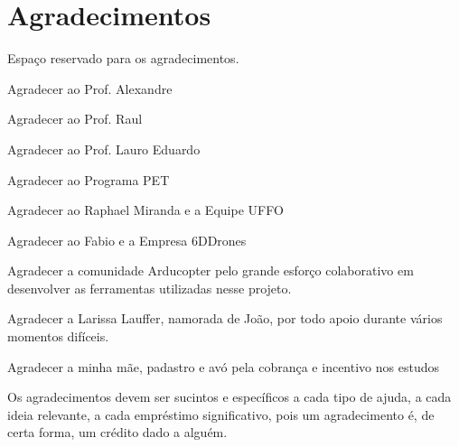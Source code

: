 \documentclass[12pt,a4paper,oneside]{book}
\begin{document}
\chapter*{Agradecimentos}

\thispagestyle{myheadings}

Espaço reservado para os agradecimentos.

Agradecer ao Prof. Alexandre

Agradecer ao Prof. Raul

Agradecer ao Prof. Lauro Eduardo

Agradecer ao Programa PET

Agradecer ao Raphael Miranda e a Equipe UFFO

Agradecer ao Fabio e a Empresa 6DDrones

Agradecer a comunidade Arducopter pelo grande esforço colaborativo em desenvolver as ferramentas utilizadas nesse projeto.

Agradecer a Larissa Lauffer, namorada de João, por todo apoio durante vários momentos difíceis.

Agradecer a minha mãe, padastro e avó pela cobrança e incentivo nos estudos


Os agradecimentos devem ser sucintos e específicos
a cada tipo de ajuda, a cada ideia relevante, 
a cada empréstimo significativo, pois um agradecimento
é, de certa forma, um crédito dado a alguém.




%
\listoffigures
%
%
\thispagestyle{myheadings}
%


%
\listoftables
%
%
\thispagestyle{myheadings}
%


%
\tableofcontents
%
\thispagestyle{myheadings}
\end{document}
